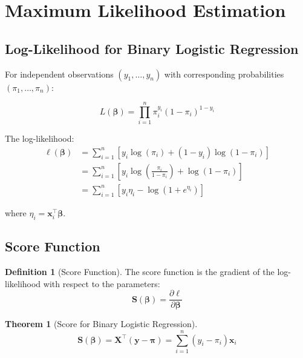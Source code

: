 \documentclass[11pt,letterpaper]{article}
\theoremstyle{definition}
\newtheorem{definition}{Definition}[section]
\newtheorem{theorem}{Theorem}[section]
\newcommand{\X}{\mathbf{X}}
\newcommand{\y}{\mathbf{y}}
\newcommand{\bb}{\boldsymbol{\beta}}
\newcommand{\pp}{\boldsymbol{\pi}}
\begin{document}
\section{Maximum Likelihood Estimation}

\subsection{Log-Likelihood for Binary Logistic Regression}

For independent observations $(y_1, \ldots, y_n)$ with corresponding probabilities $(\pi_1, \ldots, \pi_n)$:

\begin{equation}
    L(\bb) = \prod_{i=1}^{n} \pi_i^{y_i} (1-\pi_i)^{1-y_i}
\end{equation}

The log-likelihood:
\begin{align}
    \ell(\bb) &= \sum_{i=1}^{n} \left[ y_i \log(\pi_i) + (1-y_i) \log(1-\pi_i) \right] \\
    &= \sum_{i=1}^{n} \left[ y_i \log\left(\frac{\pi_i}{1-\pi_i}\right) + \log(1-\pi_i) \right] \\
    &= \sum_{i=1}^{n} \left[ y_i \eta_i - \log(1 + e^{\eta_i}) \right]
    \label{eq:binary-loglik}
\end{align}

where $\eta_i = \mathbf{x}_i^\top \bb$.

\subsection{Score Function}

\begin{definition}[Score Function]
The score function is the gradient of the log-likelihood with respect to the parameters:
\begin{equation}
    \mathbf{S}(\bb) = \frac{\partial \ell}{\partial \bb}
\end{equation}
\end{definition}

\begin{theorem}[Score for Binary Logistic Regression]
\begin{equation}
    \mathbf{S}(\bb) = \X^\top (\y - \pp) = \sum_{i=1}^{n} (y_i - \pi_i) \mathbf{x}_i
    \label{eq:score}
\end{equation}
\end{theorem}
\end{document}
